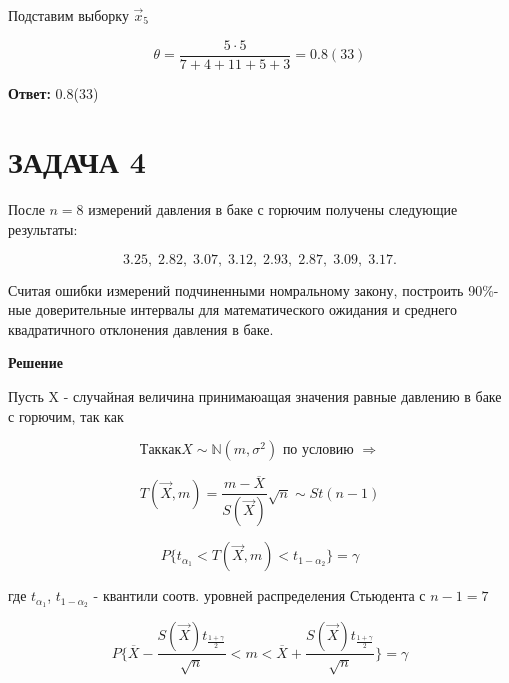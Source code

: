 \documentclass[12pt, a4paper]{report}
\begin{document}
	Подставим выборку $\vec x_5$
	
	\begin{equation*}
	\theta = \frac{5 \cdot 5}{7 + 4 + 11 + 5 + 3} = 0.8(33)
	\end{equation*}
	
	\vspace{0.5cm}
	\textbf{Ответ:} 0.8(33)
	
	
	
	
	
	
	
	
	\newpage
	
	\section{ЗАДАЧА 4}
	
	\hspace{0.4cm} После $n = 8$ измерений давления в баке с горючим получены следующие результаты:
	
	\begin{equation*}
	3.25,\; 2.82,\; 3.07,\; 3.12,\; 2.93,\; 2.87,\; 3.09,\; 3.17.
	\end{equation*}
	
	Считая ошибки измерений подчиненными номральному закону, построить 90\%-ные доверительные интервалы для математического ожидания и среднего квадратичного отклонения давления в баке.
	
	
	\vspace{0.2cm}
	\textbf{Решение}
	
	Пусть X - случайная величина принимаюащая значения равные давлению в баке с горючим, так как
	
	\begin{equation*}
	Так как X \sim \mathbb{N}(m, \sigma^2) \text{ по условию } \Rightarrow
	\end{equation*}
	
	\begin{equation*}
	T(\vec{X}, m) = \frac{m-\overline{X}}{S(\vec{X})} \sqrt{n} \sim St(n-1)
	\end{equation*}
	
	\begin{equation*}
	P \{ t_{\alpha_1} < T(\vec{X}, m) < t_{1-\alpha_2} \} = \gamma
	\end{equation*}
	
	где $t_{\alpha_1}$, $t_{1 - \alpha_2}$ - квантили соотв. уровней распределения Стьюдента с $n-1 = 7$
	
	\begin{equation*}
	P \{  \overline{X} - \frac{S(\vec{X}) t_{\frac{1 + \gamma}{2}}}{\sqrt{n}} < m < \overline{X} + \frac{S(\vec{X}) t_{\frac{1 + \gamma}{2}}}{\sqrt{n}}   \} = \gamma
	\end{equation*}
	
\end{document}
